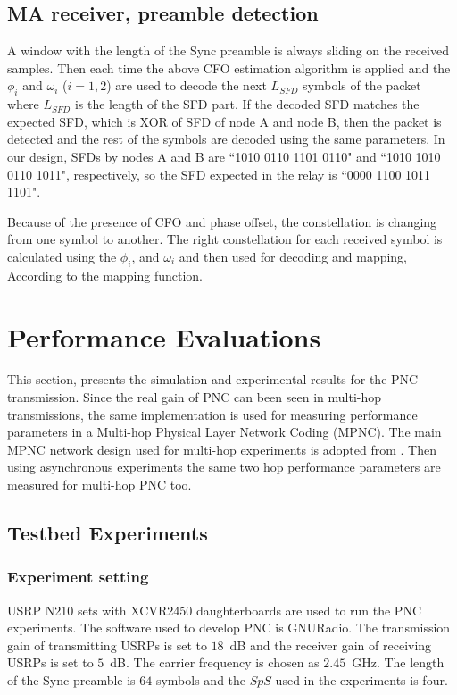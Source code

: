 \subsection{MA receiver, preamble detection}
A window with the length of the Sync preamble is always sliding on the received samples. Then each time the above CFO estimation algorithm is applied and the $\phi_i$ and $\omega_i$ ($i=1,2$) are used to decode the next $L_{SFD}$ symbols of the packet where $L_{SFD}$  is the length of the SFD part. If the decoded SFD matches the expected SFD, which is XOR of SFD of node A and node B, %
 then the packet is detected and the rest of the symbols are decoded using the same parameters. In our design, SFDs by nodes A  and B are ``1010 0110 1101 0110" and ``1010 1010 0110 1011", respectively, so the SFD expected in the relay is ``0000 1100 1011 1101". 
 
Because of the presence of CFO and phase offset, the constellation is changing from one symbol to another. The right constellation for each received symbol is calculated using the $\phi_i$, and $\omega_i$ and then used for decoding and mapping, According to the mapping function. %

\section{Performance Evaluations}
This section, presents the simulation and experimental results for the PNC transmission. Since the real gain of PNC can been seen in multi-hop transmissions, the same implementation is used for measuring performance parameters in a Multi-hop Physical Layer Network Coding (MPNC). The main MPNC network design used for multi-hop experiments is adopted from \cite{zhang2017cross}. Then using asynchronous experiments the same two hop performance parameters are measured for multi-hop PNC too. 

\subsection{Testbed Experiments}

\subsubsection{Experiment setting}
USRP N210 sets with XCVR2450 daughterboards are used to run the PNC experiments. The software used to develop PNC is GNURadio. The transmission gain of transmitting USRPs is set to $18$~dB and the receiver gain of receiving USRPs is set  to $5$~dB. %
The carrier frequency is chosen as $2.45$~GHz. The length of the Sync preamble is $64$ symbols and the $SpS$ used in the experiments is four. 



